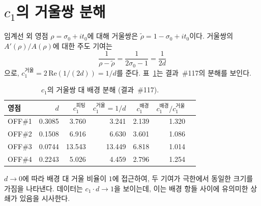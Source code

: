 \documentclass[11pt, a4paper]{article}
\theoremstyle{plain}
\theoremstyle{definition}
\begin{document}
\section{$c_{1}$의 거울쌍 분해}
\label{app:mirror}

임계선 외 영점 $\rho=\sigma_{0}+it_{0}$에 대해
거울쌍은 $\tilde\rho=1-\sigma_{0}+it_{0}$이다.
거울쌍의 $A'(\rho)/A(\rho)$에 대한 주도 기여는
\[
  \frac{1}{\rho-\tilde\rho} = \frac{1}{2\sigma_{0}-1} = \frac{1}{2d}
\]
으로, $c_{1}^{\text{거울}} = 2\,\mathrm{Re}(1/(2d)) = 1/d$를 준다.
표~\ref{tab:mirror}는 결과~\#117의 분해를 보인다.

\begin{table}[ht]
\centering
\caption{$c_{1}$의 거울쌍 대 배경 분해 (결과~\#117).}
\label{tab:mirror}
\small
\begin{tabular}{lrrrrrr}
\toprule
영점 & $d$ & $c_{1}^{\text{피팅}}$ & $c_{1}^{\text{거울}}=1/d$ & $c_{1}^{\text{배경}}$ & $c_{1}^{\text{배경}}/c_{1}^{\text{거울}}$ \\
\midrule
OFF\#1 & 0.3085 & 3.760 & 3.241 & 2.139 & 1.320 \\
OFF\#2 & 0.1508 & 6.916 & 6.630 & 3.601 & 1.086 \\
OFF\#3 & 0.0744 & 13.543 & 13.449 & 6.818 & 1.014 \\
OFF\#4 & 0.2243 & 5.026 & 4.459 & 2.796 & 1.254 \\
\bottomrule
\end{tabular}
\end{table}

$d\to 0$에 따라 배경 대 거울 비율이 $1$에 접근하여,
두 기여가 극한에서 동일한 크기를 가짐을 나타낸다.
데이터는 $c_{1}\cdot d\to 1$을 보이는데, 이는
배경 항들 사이에 유의미한 상쇄가 있음을 시사한다.
\end{document}
